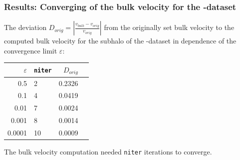 \begin{frame}
	\frametitle{Results: Converging of the bulk velocity for the \dt-dataset}
	
The deviation $D_{orig} = \left | 	 \frac{v_{bulk} - v_{orig}}{v_{orig}}				\right |$  from the originally set bulk velocity to the computed bulk velocity for the subhalo of the \dt-dataset in dependence of the convergence limit $\varepsilon$:

	
	\begin{table}[!htb]
		\begin{centering}
			\begin{tabular}[t]{r | l | r | l }
				$\varepsilon$     &  \texttt{niter}  		&	$D_{orig}$	\\
				\hline
				0.5       &    	 		2    	&	0.2326  \\
				0.1       &   	       	4    	&	0.0419	\\
				0.01      &           	7    	&	0.0024	\\
				0.001     &            	8    	&	0.0014  \\       
				0.0001    &        		10    	&	0.0009 	\\
			\end{tabular}
		\end{centering}
	\end{table}
	
	The bulk velocity computation needed \texttt{niter} iterations to converge.
	
\end{frame}




